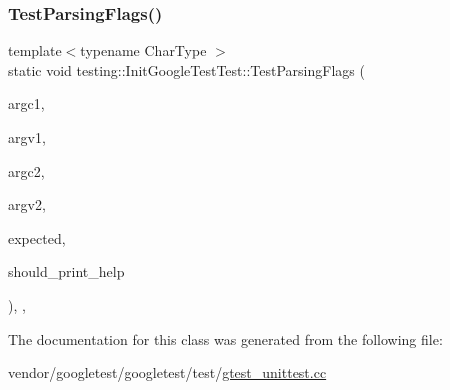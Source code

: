 \subsubsection{\texorpdfstring{Test\+Parsing\+Flags()}{TestParsingFlags()}}
{\footnotesize\ttfamily template$<$typename Char\+Type $>$ \\
static void testing\+::\+Init\+Google\+Test\+Test\+::\+Test\+Parsing\+Flags (\begin{DoxyParamCaption}\item[{int}]{argc1,  }\item[{const Char\+Type $\ast$$\ast$}]{argv1,  }\item[{int}]{argc2,  }\item[{const Char\+Type $\ast$$\ast$}]{argv2,  }\item[{const \hyperlink{structtesting_1_1_flags}{Flags} \&}]{expected,  }\item[{bool}]{should\+\_\+print\+\_\+help }\end{DoxyParamCaption})\hspace{0.3cm}{\ttfamily [inline]}, {\ttfamily [static]}, {\ttfamily [protected]}}



The documentation for this class was generated from the following file\+:\begin{DoxyCompactItemize}
\item 
vendor/googletest/googletest/test/\hyperlink{gtest__unittest_8cc}{gtest\+\_\+unittest.\+cc}\end{DoxyCompactItemize}

